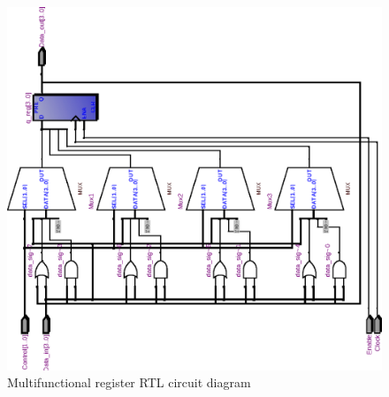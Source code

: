 \documentclass[10pt,a4paper]{report}
\begin{document}
\begin{figure}
\includegraphics[scale=0.7,angle=-90]{graphs/reg_4bit.rtl.eps}
\caption{\small{Multifunctional register RTL circuit diagram}} \label{rtl:reg4}
\end{figure}
\end{document}
